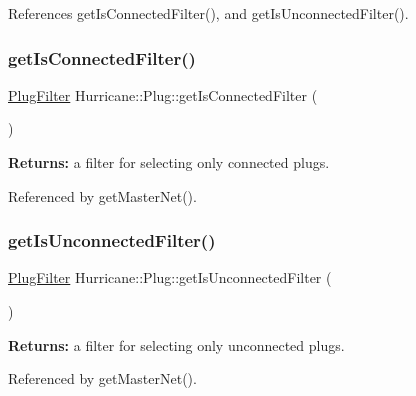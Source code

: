 References get\+Is\+Connected\+Filter(), and get\+Is\+Unconnected\+Filter().

\mbox{\label{classHurricane_1_1Plug_a51bd5d04a337544709950d7cace05f0d}} 
\subsubsection{\texorpdfstring{get\+Is\+Connected\+Filter()}{getIsConnectedFilter()}}
{\footnotesize\ttfamily \hyperlink{namespaceHurricane_ad6b0bd4bdff4c52e6163b9f54e3e5c92}{Plug\+Filter} Hurricane\+::\+Plug\+::get\+Is\+Connected\+Filter (\begin{DoxyParamCaption}{ }\end{DoxyParamCaption})\hspace{0.3cm}{\ttfamily [static]}}

{\bfseries Returns\+:} a filter for selecting only connected plugs. 

Referenced by get\+Master\+Net().

\mbox{\label{classHurricane_1_1Plug_af27b873ed2420329a63ea67dcc243f07}} 
\subsubsection{\texorpdfstring{get\+Is\+Unconnected\+Filter()}{getIsUnconnectedFilter()}}
{\footnotesize\ttfamily \hyperlink{namespaceHurricane_ad6b0bd4bdff4c52e6163b9f54e3e5c92}{Plug\+Filter} Hurricane\+::\+Plug\+::get\+Is\+Unconnected\+Filter (\begin{DoxyParamCaption}{ }\end{DoxyParamCaption})\hspace{0.3cm}{\ttfamily [static]}}

{\bfseries Returns\+:} a filter for selecting only unconnected plugs. 

Referenced by get\+Master\+Net().

\mbox{\label{classHurricane_1_1Plug_a177400e23157885a76c924bf53000957}} 
